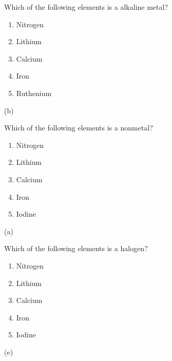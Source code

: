 \documentclass[main.tex]{subfiles}
\begin{document}
\begin{multicols*}{2}
\begin{question}[ID=6]
Which of the following elements is a alkaline metal?
\begin{multicols}{2}
  \noindent
  \begin{enumerate} [topsep=0pt, partopsep=1pt, label=(\alph*), leftmargin=1cm]
\item Nitrogen
\item Lithium
\item Calcium
\item Iron
\item Ruthenium
\end{enumerate}
\end{multicols}    
\end{question}
\begin{solution}
(b)
\hspace{0.1cm}\end{solution}



\begin{question}[ID=7]
Which of the following elements is a nonmetal?
\begin{multicols}{2}
  \noindent
  \begin{enumerate} [topsep=0pt, partopsep=1pt, label=(\alph*), leftmargin=1cm]
\item Nitrogen
\item Lithium
\item Calcium
\item Iron
\item Iodine
\end{enumerate}
\end{multicols}    
\end{question}
\begin{solution}
 (a)
\hspace{0.1cm}\end{solution}





\begin{question}[ID=8]
Which of the following elements is a halogen?
\begin{multicols}{2}
  \noindent
  \begin{enumerate} [topsep=0pt, partopsep=1pt, label=(\alph*), leftmargin=1cm]
\item Nitrogen
\item Lithium
\item Calcium
\item Iron
\item Iodine
\end{enumerate}
\end{multicols}    
\end{question}
\begin{solution}
(e)
\hspace{0.1cm}\end{solution}




\end{multicols*}
\end{document}
